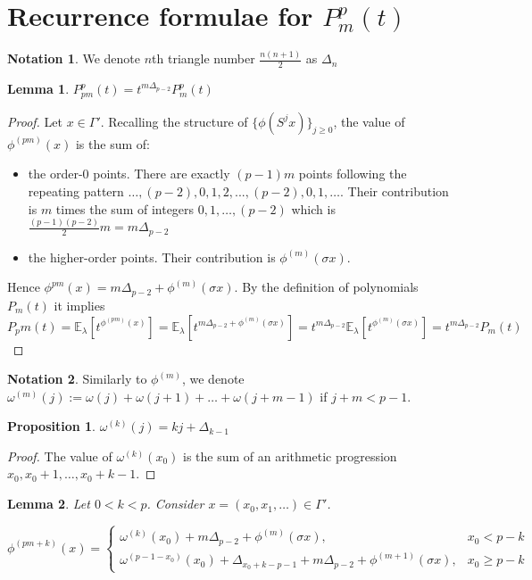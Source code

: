 \documentclass[a4paper]{article}
\theoremstyle{plain}
\newtheorem{lemma}{Lemma}[section]
\newtheorem{proposition}{Proposition}[section]
\theoremstyle{definition}
\newtheorem*{notation}{Notation}
\begin{document}
\section{Recurrence formulae for $P_m^p(t)$}\label{recurrence}
\begin{notation} We denote $n$th triangle number $\frac{n(n+1)}{2}$ as $\Delta_n$ \end{notation}
\begin{lemma}\label{simpleCase} $P_{pm}^p(t)=t^{m\Delta_{p-2}}P_m^p(t)$
\end{lemma}
\begin{proof}
Let $x \in \Gamma'$. Recalling the structure of $\{\phi(S^j x)\}_{j \ge 0}$, the value of $\phi^{(pm)}(x)$ is the sum of:
\begin{itemize}
\item the order-$0$ points. There are exactly $(p-1)m$ points following the repeating pattern $\ldots,(p-2),0,1,2,...,(p-2),0,1,\ldots$. Their contribution is $m$ times the sum of integers $0,1,\ldots,(p-2)$ which is $\frac{(p-1)(p-2)}{2}m=m\Delta_{p-2}$
\item the higher-order points. Their contribution is $\phi^{(m)}(\sigma x)$.
\end{itemize}
Hence $\phi^{pm}(x) = m\Delta_{p-2} + \phi^{(m)}(\sigma x)$. By the definition of polynomials $P_m(t)$ it implies 
$P_pm(t) = \mathbb{E}_\lambda\left[ t^{\phi^{(pm)}(x)}\right] = 
\mathbb{E}_\lambda\left[ t^{m\Delta_{p-2} + \phi^{(m)}(\sigma x)}\right] = 
t^{m\Delta_{p-2}} \mathbb{E}_\lambda \left[ t^{\phi^{(m)} (\sigma x)}  \right] = 
t^{m\Delta_{p-2} }P_m(t)$
\end{proof}
\begin{notation}
Similarly to $\phi^{(m)}$, we denote $\omega^{(m)}(j) := \omega(j) + \omega(j+1) + \ldots + \omega(j+m-1)$ if $j + m < p - 1$.
\end{notation}
\begin{proposition} $\omega^{(k)}(j) = k j + \Delta_{k-1}$
\end{proposition}
\begin{proof}
The value of $\omega^{(k)}(x_0)$ is the sum of an arithmetic progression $x_0, x_0 + 1, \ldots, x_0 + k-1$.
\end{proof}
\begin{lemma} \label{phiLemma}
Let $0 < k < p$. Consider $x=(x_0,x_1,\ldots) \in \Gamma'$.

$\phi^{(pm+k)}(x)= 
\begin{cases}
\omega^{(k)}(x_0) + m\Delta_{p-2} + \phi^{(m)}(\sigma x), & x_0 < p-k\\
\omega^{(p-1-x_0)}(x_0) + \Delta_{x_0+k-p-1}+m\Delta_{p-2}+\phi^{(m+1)}(\sigma x), & x_0 \ge p-k
\end{cases}$
\end{lemma}
\end{document}
